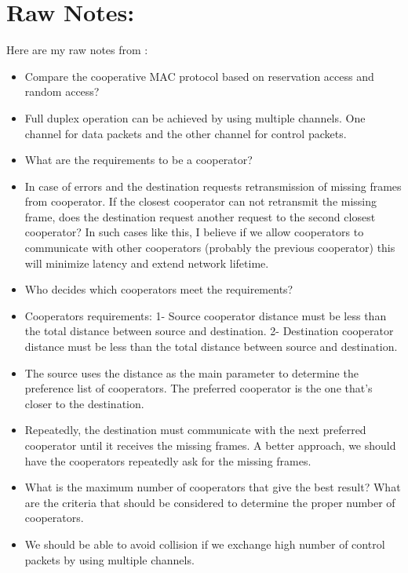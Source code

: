 \documentclass{article}
\begin{document}
\section*{Raw Notes:}
Here are my raw notes from \cite{Kim2016}:
\begin{itemize}
  \item Compare the cooperative MAC protocol based on reservation access and random access?
  \item Full duplex operation can be achieved by using multiple channels. One channel for data packets and the other channel for control packets.
  \item What are the requirements to be a cooperator?
  \item In case of errors and the destination requests retransmission of missing frames from cooperator. If the closest cooperator can not retransmit the missing frame, does the destination request another request to the second closest cooperator? In such cases like this, I believe if we allow cooperators to communicate with other cooperators (probably the previous cooperator) this will minimize latency and extend network lifetime. 
  \item Who decides which cooperators meet the requirements?
  \item Cooperators requirements: 1- Source cooperator distance must be less than the total distance between source and destination. 2- Destination cooperator distance must be less than the total distance between source and destination.
  \item The source uses the distance as the main parameter to determine the preference list of cooperators. The preferred cooperator is the one that's closer to the destination.
  \item Repeatedly, the destination must communicate with the next preferred cooperator until it receives the missing frames. A better approach, we should have the cooperators repeatedly ask for the missing frames.
  \item What is the maximum number of cooperators that give the best result? What are the criteria that should be considered to determine the proper number of cooperators.  
  \item We should be able to avoid collision if we exchange high number of control packets by using multiple channels.\\


\end{itemize}
\end{document}
